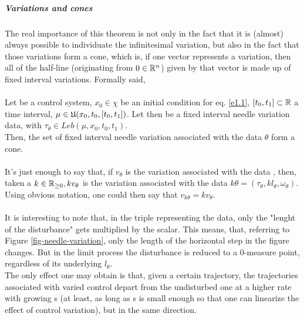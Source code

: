 \subparagraph[4.10]{Variations and cones} The real importance of this theorem is not only in the fact that it is (almost) always possible to individuate the infinitesimal variation, but also in the fact that those variations form a cone, which is, if one vector represents a variation, then all of the half-line (originating from $0\in\mathbb{R}^n$) given by that vector is made up of fixed interval variations. Formally said, \\\\

 Let \controlSystem\space be a control system, $x_0\in\chi$ be an initial condition for eq. \eqref{e1.1}, $[t_0,t_1]\subset\mathbb{R}$ a time interval, $\mu\in\mathfrak{U}(x_0,t_0,[t_0,t_1])$. Let then \fivData\space be a fixed interval needle variation data, with $\tau_\theta\in Leb(\mu,x_0,t_0,t_1)$.\\
Then, the set of fixed interval needle variation associated with the data $\theta$ form a cone.\\\\
 It's just enough to say that, if $v_\theta$ is the variation associated with the data \fivData, then, taken a $k\in\mathbb{R}_{\geq0}, kv_\theta$ is the variation associated with the data $k\theta=(\tau_\theta,kl_\theta,\omega_\theta)$. Using obvious notation, one could then say that $v_{k\theta}=kv_\theta$.\\\\
It is interesting to note that, in the triple representing the data, only the "lenght of the disturbance" gets multiplied by the scalar. This means, that, referring to Figure \ref{fig-needle-variation}, only the length of the horizontal step in the figure changes. But in the limit process the disturbance is reduced to a 0-measure point, regardless of its underlying $l_\theta$.\\
The only effect one may obtain is that, given a certain trajectory, the trajectories associated with varied control depart from the undisturbed one at a higher rate with growing s (at least, as long as s is small enough so that one can linearize the effect of control variation), but in the same direction.

